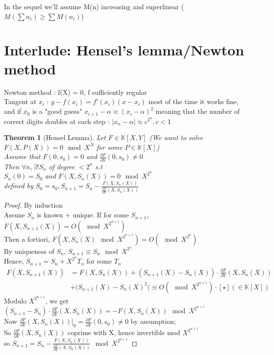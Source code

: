 \documentclass{article}
\newtheorem{theorem}{Theorem}
\theoremstyle{definition}
\theoremstyle{remark}
\newcommand{\Thm}[3]{\begin{theorem}[#1]\label{#2}#3\end{theorem}}
\newcommand{\Proof}[1]{\begin{proof}#1\end{proof}}
\newcommand{\K}{\mathbb{K}}
\begin{document}
\subparagraph{}
In the sequel we'll assume M(n) increasing and superlinear ($M(\sum n_i) \geq \sum M(n_i)$)

\section{Interlude: Hensel's lemma/Newton method}
Newton method :
f(X) = 0, f sufficiently regular\\
Tangent at $x_i$ : $y - f(x_i) = f'(x_i)(x-x_i)$
most of the time it works fine, and if $x_0$ is a "good guess"
$x_{i+1} - \alpha \approx (x_i - \alpha)^2$ meaning that the number of correct digits doubles at each step : $|x_n - \alpha| \approx c^{2^n}, c < 1$

\Thm{Hensel Lemma}{}{Let $F \in \K[X,Y]$ (We want to solve $F(X,P(X))=0 \mod X^N$ for some $P \in \K[X]$)\\
	Assume that $F(0,s_0) = 0$ and $\frac{\partial F}{\partial Y}(0,s_0)\neq 0$\\
	Then $\forall n, \exists!S_n$ of degree $ < 2^n$ s.t\\
	$S_n(0)=S_0$ and $F(X,S_n(X))=0 \mod X^{2^n}$\\defined by $S_0 = s_0, S_{n+1} = S_n - \frac{F(X,S_n(X))}{\frac{\partial F}{\partial Y}(X,S_n(X))}$}
\Proof{By induction\\Assune $S_n$ is known + unique.
If for some $S_{n+1}$, $F(X,S_{n+1}(X)) = O(\mod X^{2^{n+1}})$\\
Then a fortiori, $F(X,S_n(X) \mod X^{2^{n+1}}) = O(\mod X^{2^n})$\\
By uniqueness of $S_n$, $S_{n+1} \equiv S_n \mod X^{2^{n}}$\\
Hence, $S_{n+1} = S_n + X^{2^{n}} T_n$ for some $T_n$\\
\begin{align*}
F(X,S_{n+1}(X)) & = F(X,S_n(X)) + (S_{n+1}(X)-S_n(X))\cdot\frac{\partial F}{\partial Y}(X,S_n(X))\\ & + (S_{n+1}(X) - S_n(X)^2(\equiv O(\mod X^{2^{n+1}}) \cdot[\star] (\in \K[X])
\end{align*}
Modulo $X^{2^{n+1}}$, we get\\
$(S_{n+1} - S_n)\cdot\frac{\partial F}{\partial Y}(X,S_n(X)) = -F(X,S_n(X)) 
\mod X^{2^{n+1}}$\\
Now $\frac{\partial F}{\partial Y}(X,S_n(X))|_0 = \frac{\partial F}{\partial Y}(0,s_0) \neq 0$ by assumption;\\
So $\frac{\partial F}{\partial Y}(X,S_n(X))$ coprime with X, hence invertible mod $X^{2^{n+1}}$\\
so $S_{n+1} = S_n - \frac{F(X,S_n(X))}{\frac{\partial F}{\partial Y}(X,S_n(X))} \mod X^{2^{n+1}}$}
\end{document}
